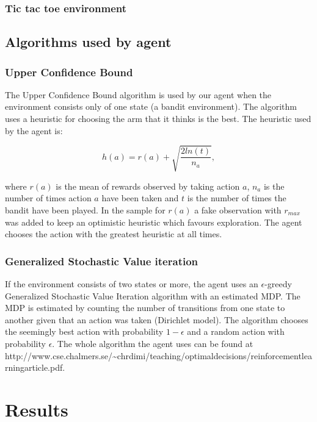 \documentclass[11pt]{article}
\numberwithin{equation}{section}
\begin{document}
\begin{flushleft}
\subsubsection{Tic tac toe environment}

\subsection{Algorithms used by agent}

\subsubsection{Upper Confidence Bound}

The Upper Confidence Bound algorithm is used by our agent when the environment consists only of one state (a bandit environment). The algorithm uses a heuristic for choosing the arm that it thinks is the best. The heuristic used by the agent is:

$$h(a) = r(a) + \sqrt{\frac{2ln(t)}{n_a}},$$

where $r(a)$ is the mean of rewards observed by taking action $a$, $n_a$ is the number of times action $a$ have been taken and $t$ is the number of times the bandit have been played. In the sample for $r(a)$ a fake observation with $r_{max}$ was added to keep an optimistic heuristic which favours exploration. The agent chooses the action with the greatest heuristic at all times.

\subsubsection{Generalized Stochastic Value iteration}

If the environment consists of two states or more, the agent uses an $\epsilon$-greedy Generalized Stochastic Value Iteration algorithm with an estimated MDP. The MDP is estimated by counting the number of transitions from one state to another given that an action was taken (Dirichlet model). The algorithm chooses the seemingly best action with probability $1-\epsilon$ and a random action with probability $\epsilon$. The whole algorithm the agent uses can be found at http://www.cse.chalmers.se/\textasciitilde chrdimi/teaching/optimal\textunderscore decisions/reinforcement\textunderscore learning\textunderscore article.pdf.

\section{Results}


\end{flushleft}
\end{document}
